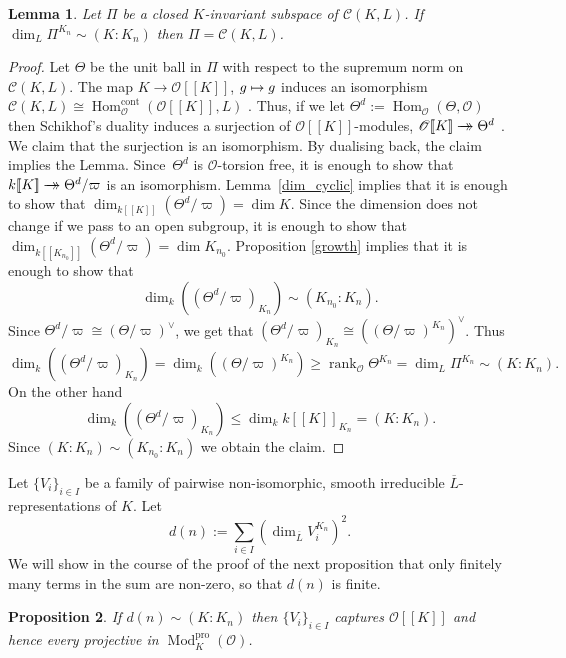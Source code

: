 \documentclass[JEP,XML,SOM,Unicode,NoEqCountersInSection]{cedram}
\let\mathcal\mathscr
\newcommand\mto{\mathchoice{\longmapsto}{\mapsto}{\mapsto}{\mapsto}}
\newcommand{\onto}{\mathchoice{\to\hspace*{-5mm}\to}{\to\hspace*{-2.85mm}\to}{\to\hspace*{-3mm}\to}{\to\hspace*{-3mm}\to}}
\newtheorem{prop}{Proposition}[section]
\newtheorem{lem}[prop]{Lemma}
\theoremstyle{definition}
\DeclareMathOperator{\Hom}{Hom}
\DeclareMathOperator{\rank}{rank}
\DeclareMathOperator{\Mod}{Mod}
\newcommand{\br}[1]{[\![#1]\!]}
\newcommand{\cO}{\mathcal{O}}
\newcommand{\pro}{\mathrm{pro}}
\newcommand{\cont}{\mathrm{cont}}
\begin{document}
\begin{lem}\label{cap_ban} Let $\Pi$ be a closed $K$-invariant subspace of
$\mathcal C(K, L)$. If $\dim_L \Pi^{K_n} \sim (K:K_n)$ then $\Pi= \mathcal C(K,
L)$.
\end{lem}

\begin{proof} Let $\Theta$ be the unit ball in $\Pi$ with respect to the supremum norm on $\mathcal C(K, L)$. The map
$K\to \cO\br{K}$, $g \mto g$ induces an isomorphism $\mathcal C(K, L)\cong \Hom^{\cont}_{\cO}(\cO\br{K}, L)$ \cite[Cor.\,2.2]{iw}.
Thus, if we let $\Theta^d:=\Hom_{\cO}(\Theta, \cO)$ then Schikhof's duality induces a surjection of $\cO\br{K}$-modules, $\cO\br{K}\onto \Theta^d$ \cite[Th.\,3.5]{iw}. We claim that the surjection is
an isomorphism. By dualising back, the claim implies the Lemma. Since~$\Theta^d$ is $\cO$\nobreakdash-torsion free, it is enough to show that $k\br{K}\onto \Theta^d/\varpi$ is an isomorphism.
Lemma~\ref{dim_cyclic} implies that it is enough to show that $\dim_{k\br{K}} ( \Theta^d/\varpi)= \dim K$. Since the dimension does not change if we pass to an open subgroup, it is enough
to show that $\dim_{k\br{K_{n_0}}} ( \Theta^d/\varpi)= \dim K_{n_0}$. Proposition \ref{growth} implies that it is enough to show that
\[
\dim_k (( \Theta^d/\varpi)_{K_n})\sim (K_{n_0} : K_n).
\]
Since
$\Theta^d/\varpi \cong (\Theta/\varpi)^{\vee}$, we get that $( \Theta^d/\varpi)_{K_n}\cong (( \Theta/\varpi)^{K_n})^{\vee}$. Thus
\[
\dim_k (( \Theta^d/\varpi)_{K_n})= \dim_k (( \Theta/\varpi)^{K_n}) \ge \rank_{\cO} \Theta^{K_n}= \dim_L \Pi^{K_n}\sim (K: K_n).
\]
On the other hand
\[
\dim_k (( \Theta^d/\varpi)_{K_n})\le \dim_k k\br{K}_{K_n}=(K:K_n).
\]
Since $(K: K_n)\sim (K_{n_0}: K_n)$ we obtain the claim.
\end{proof}

Let $\{V_i\}_{i\in I}$ be a family of pairwise non-isomorphic, smooth irreducible
$\overline{L}$\nobreakdash-represen\-tations of
$K$. Let
\[
d(n):= \sum_{i\in I} (\dim_{\overline{L}} V_i^{K_n})^2.
\]
We will show in the course of the proof of the next proposition that only finitely many terms in the sum are non-zero, so that $d(n)$ is finite.

\begin{prop}\label{criterion} If $d(n)\sim (K:K_n)$ then $\{V_i\}_{i\in I}$ captures $\cO\br{K}$ and hence every projective in
$\Mod^{\pro}_K(\cO)$.
\end{prop}
\end{document}
